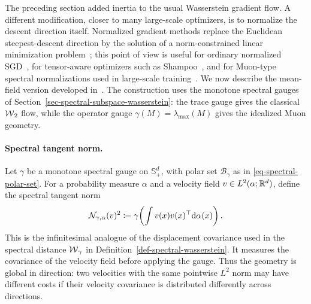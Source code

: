 The preceding section added inertia to the usual Wasserstein gradient flow. A different modification, closer to many large-scale optimizers, is to normalize the descent direction itself. Normalized gradient methods replace the Euclidean steepest-descent direction by the solution of a norm-constrained linear minimization problem~\cite{PethickXieAntonakopoulosEtAl2025}; this point of view is useful for ordinary normalized SGD~\cite{MurraySwensonKar2019,CutkoskyMehta2020}, for tensor-aware optimizers such as Shampoo~\cite{GuptaKorenSinger2018}, and for Muon-type spectral normalizations used in large-scale training~\cite{KellerJordan2024,LiuSuYaoEtAl2025}. We now describe the mean-field version developed in~\cite{peyre2026muon}. The construction uses the monotone spectral gauges of Section~\ref{sec-spectral-subspace-wasserstein}: the trace gauge gives the classical $\operatorname{\mathcal{W}}_2$ flow, while the operator gauge $\gamma(M)=\lambda_{\max}(M)$ gives the idealized Muon geometry.

\paragraph{Spectral tangent norm.}
Let $\gamma$ be a monotone spectral gauge on $\mathbb S_+^d$, with polar set $\mathcal B_\gamma$ as in \eqref{eq-spectral-polar-set}. For a probability measure $\alpha$ and a velocity field $v\in L^2(\alpha;\mathbb{R}^d)$, define the spectral tangent norm
\begin{equation}\label{eq-normalized-spectral-tangent-norm}
	\mathcal N_{\gamma,\alpha}(v)^2
	\coloneqq
	\gamma\!\left(\int v(x)v(x)^\top\mathrm{d}\alpha(x)\right).
\end{equation}
This is the infinitesimal analogue of the displacement covariance used in the spectral distance $\operatorname{\mathcal{W}}_\gamma$ in Definition~\ref{def-spectral-wasserstein}. It measures the covariance of the velocity field before applying the gauge. Thus the geometry is global in direction: two velocities with the same pointwise $L^2$ norm may have different costs if their velocity covariance is distributed differently across directions.


